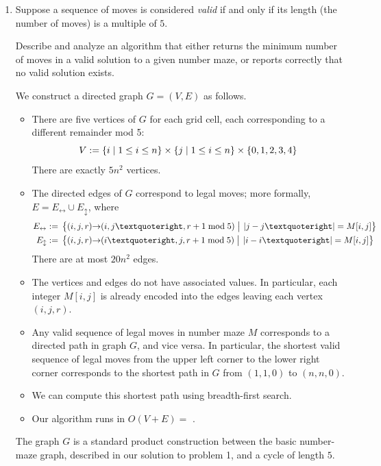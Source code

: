 \documentclass[11pt]{article}
\begin{document}
\begin{enumerate}
\begin{Solution}
\begin{itemize}
\end{itemize}
The graph $G$ is a standard product construction between the basic number-maze graph, described in our solution to problem 1, and a cycle of length $2$.
\end{Solution}

\newpage
\item
Suppose a sequence of moves is considered \emph{valid} if and only if its length (the number of moves) is a multiple of $5$.

Describe and analyze an algorithm that either returns the minimum number of moves in a valid solution to a given number maze, or reports correctly that no valid solution exists.

\begin{Solution}
We construct a directed graph $G=(V,E)$ as follows.
\begin{itemize}
\item
There are five vertices of $G$ for each grid cell, each corresponding to a different remainder mod 5:
\[
	V := \{ i\mid 1\le i\le n \}
			\times \{ j\mid 1\le i\le n \}
			\times \{ 0,1,2,3,4 \}
\]
There are exactly $5n^2$ vertices.

\item
The directed edges of $G$ correspond to legal moves; more formally, $E = E_\leftrightarrow \cup E_\updownarrow$, where
\begin{align*}
	E_\leftrightarrow := {}&
		\Setbar{(i,j,r)\arcto(i,j’,r+1\bmod 5)\strut}{\abs{j-j’} = M[i,j]}
	\\
	E_\updownarrow := {}&
		 \Setbar{(i,j,r)\arcto(i’,j,r+1\bmod 5)\strut}{\abs{i-i’} = M[i,j]}
\end{align*}
There are at most $20n^2$ edges.

\item
The vertices and edges do not have associated values.  In particular, each integer $M[i,j]$ is already encoded into the edges leaving each vertex $(i,j,r)$.

\item
Any valid sequence of legal moves in number maze $M$ corresponds to a directed path in graph $G$, and vice versa.  In particular, the shortest valid sequence of legal moves from the upper left corner to the lower right corner corresponds to the shortest path in $G$ from $(1,1,0)$ to $(n,n,0)$.

\item
We can compute this shortest path using breadth-first search.

\item
Our algorithm runs in $O(V+E) =$ .

\end{itemize}
The graph $G$ is a standard product construction between the basic number-maze graph, described in our solution to problem 1, and a cycle of length $5$.
\end{Solution}
\end{enumerate}
\end{document}
